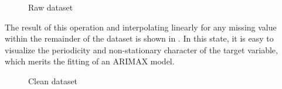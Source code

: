 \documentclass{scrartcl}
\begin{document}
  \begin{figure}
    \centering
    
    \caption{Raw dataset}
    \label{fig:timeseries_raw}
  \end{figure}

  The result of this operation and interpolating linearly for any missing value within the remainder of the dataset is shown in . In this state, it is easy to visualize the periodicity and non-stationary character of the target variable, which merits the fitting of an ARIMAX model.

  \begin{figure}
    \centering
    
    \caption{Clean dataset}
    \label{fig:timeseries_clean}
  \end{figure}
\end{document}
